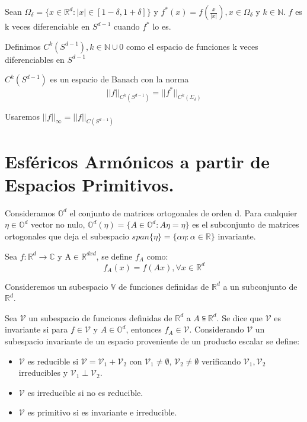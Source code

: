 \begin{prop}Sean $\Omega_\delta = \{x\in\mathds{R}^d : |x|\in[1-\delta,1+\delta]\}$ y $f^*(x)= f(\frac{x}{|x|}),x\in\Omega_\delta$ y $k\in\mathds{N}$. $f$ es k veces diferenciable en $S^{d-1}$ cuando $f^*$ lo es.  
\end{prop}
\begin{defn}Definimos $C^k(S^{d-1}), k\in\mathds{N}\cup0$ como el espacio de funciones k veces diferenciables en $S^{d-1}$
\end{defn}
\begin{prop}$C^k(S^{d-1})$ es un espacio de Banach con la norma 
	$$
	||f||_{C^k(S^{d-1})} = ||f^*||_{C^k(\Sigma_\delta)}
	$$
\end{prop}
\begin{rem}Usaremos $||f||_\infty = ||f||_{C(S^{d-1})}$

\end{rem}
\section{Esféricos Armónicos a partir de Espacios Primitivos.}
Consideramos $\mathds{O}^d$ el conjunto de matrices ortogonales de orden d. Para cualquier $\eta \in \mathds{O}^d$ vector no nulo, $\mathds{O}^d (\eta)= \{ A \in \mathds{O}^d : A\eta = \eta \} $ es el subconjunto de matrices ortogonales que deja el subespacio $span\{\eta\} = \{\alpha \eta : \alpha \in \mathds{R}\}$ invariante.

\begin{defn}
	Sea $f:\mathds{R}^d \to \mathds{C}$ y A$ \in \mathds{R}^{dxd}$, se define $f_A$ como:
	$$
	f_A(x)=f(Ax)   , \forall x \in \mathds{R}^d
	$$
\end{defn}

Consideremos un subespacio $\mathds{V}$ de funciones definidas de $\mathds{R}^d$ a un subconjunto de $\mathds{R}^d$.
\begin{defn}
	Sea $\mathcal{V}$ un subespacio de funciones definidas de $\mathds{R}^d$ a $A \subseteqq \mathds{R}^d$. Se dice que $\mathcal{V}$ es invariante si para  $f \in \mathcal{V}$ y  $A\in\mathds{O}^d$, entonces  $f_A \in \mathcal{V}$.
	Considerando $\mathcal{V}$ un subespacio invariante de un espacio proveniente de un producto escalar se define:
	\begin{itemize}
		\item $\mathcal{V}$ es reducible si  $\mathcal{V} = \mathcal{V}_1 + \mathcal{V}_2$ con $\mathcal{V}_1 \not= \emptyset$, $\mathcal{V}_2 \not= \emptyset$ verificando $\mathcal{V}_1,\mathcal{V}_2$ irreducibles y $\mathcal{V}_1 \perp \mathcal{V}_2$.
		\item $\mathcal{V}$ es irreducible si no es reducible.
		\item $\mathcal{V}$ es primitivo si es invariante e irreducible.
	\end{itemize}
\end{defn}

